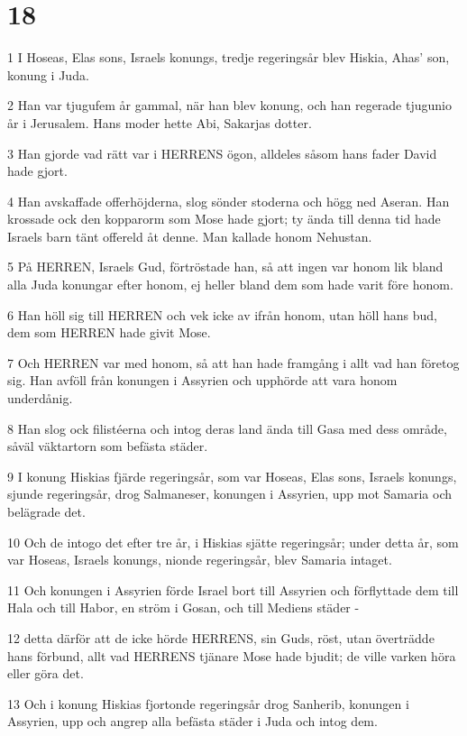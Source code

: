 \chapter{18}

\par 1 I Hoseas, Elas sons, Israels konungs, tredje regeringsår blev Hiskia, Ahas' son, konung i Juda.
\par 2 Han var tjugufem år gammal, när han blev konung, och han regerade tjugunio år i Jerusalem. Hans moder hette Abi, Sakarjas dotter.
\par 3 Han gjorde vad rätt var i HERRENS ögon, alldeles såsom hans fader David hade gjort.
\par 4 Han avskaffade offerhöjderna, slog sönder stoderna och högg ned Aseran. Han krossade ock den kopparorm som Mose hade gjort; ty ända till denna tid hade Israels barn tänt offereld åt denne. Man kallade honom Nehustan.
\par 5 På HERREN, Israels Gud, förtröstade han, så att ingen var honom lik bland alla Juda konungar efter honom, ej heller bland dem som hade varit före honom.
\par 6 Han höll sig till HERREN och vek icke av ifrån honom, utan höll hans bud, dem som HERREN hade givit Mose.
\par 7 Och HERREN var med honom, så att han hade framgång i allt vad han företog sig. Han avföll från konungen i Assyrien och upphörde att vara honom underdånig.
\par 8 Han slog ock filistéerna och intog deras land ända till Gasa med dess område, såväl väktartorn som befästa städer.
\par 9 I konung Hiskias fjärde regeringsår, som var Hoseas, Elas sons, Israels konungs, sjunde regeringsår, drog Salmaneser, konungen i Assyrien, upp mot Samaria och belägrade det.
\par 10 Och de intogo det efter tre år, i Hiskias sjätte regeringsår; under detta år, som var Hoseas, Israels konungs, nionde regeringsår, blev Samaria intaget.
\par 11 Och konungen i Assyrien förde Israel bort till Assyrien och förflyttade dem till Hala och till Habor, en ström i Gosan, och till Mediens städer -
\par 12 detta därför att de icke hörde HERRENS, sin Guds, röst, utan överträdde hans förbund, allt vad HERRENS tjänare Mose hade bjudit; de ville varken höra eller göra det.
\par 13 Och i konung Hiskias fjortonde regeringsår drog Sanherib, konungen i Assyrien, upp och angrep alla befästa städer i Juda och intog dem.
